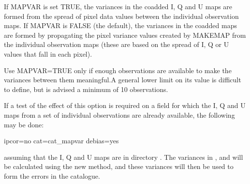 If MAPVAR is set TRUE, the variances in the coadded I, Q and U maps
are formed from the spread of pixel data values between the individual
observation maps. If MAPVAR is FALSE (the default), the variances in
the coadded maps are formed by propagating the pixel variance values
created by MAKEMAP from the individual observation maps (these are
based on the spread of I, Q or U values that fall in each pixel).

Use MAPVAR=TRUE only if enough observations are available to make the
variances between them meaningful.A general lower limit on its value
is difficult to define, but is advised a minimum of 10 observations.


If a test of the effect of this option is required on a field for which
the I, Q and U maps from a set of individual observations are already
available, the following may be done:

\begin{terminalv}
                   ipcor=no cat=cat_mapvar debias=yes
\end{terminalv}

assuming that the I, Q and U maps are in directory . The
variances in ,  and
 will be calculated using the new method, and
these variances will then be used to form the errors in the
 catalogue.



